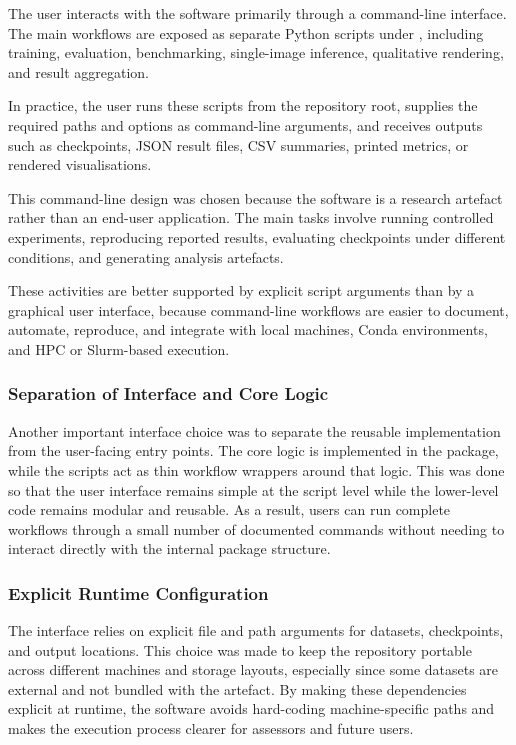 ﻿\documentclass[11pt,a4paper]{article}
\begin{document}
The user interacts with the software primarily through a command-line
interface. The main workflows are exposed as separate Python scripts under
, including training, evaluation, benchmarking,
single-image inference, qualitative rendering, and result aggregation.

\medskip

In practice, the user runs these scripts from the repository root, supplies
the required paths and options as command-line arguments, and receives outputs
such as checkpoints, JSON result files, CSV summaries, printed metrics, or
rendered visualisations.

\medskip

This command-line design was chosen because the software is a research
artefact rather than an end-user application. The main tasks involve running
controlled experiments, reproducing reported results, evaluating checkpoints
under different conditions, and generating analysis artefacts.

\medskip

These activities are better supported by explicit script arguments than by a
graphical user interface, because command-line workflows are easier to
document, automate, reproduce, and integrate with local machines, Conda
environments, and HPC or Slurm-based execution.

\subsubsection*{Separation of Interface and Core Logic}

Another important interface choice was to separate the reusable implementation
from the user-facing entry points. The core logic is implemented in the
 package, while the scripts act as thin workflow
wrappers around that logic.
This was done so that the user interface remains simple at the script level
while the lower-level code remains modular and reusable. As a result, users
can run complete workflows through a small number of documented commands
without needing to interact directly with the internal package structure.

\subsubsection*{Explicit Runtime Configuration}

The interface relies on explicit file and path arguments for datasets,
checkpoints, and output locations. This choice was made to keep the repository
portable across different machines and storage layouts, especially since some
datasets are external and not bundled with the artefact.
By making these dependencies explicit at runtime, the software avoids
hard-coding machine-specific paths and makes the execution process clearer for
assessors and future users.
\end{document}

